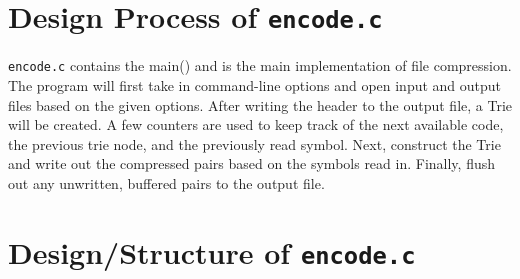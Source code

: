 \documentclass[12pt]{article}
\begin{document}
\section{Design Process of \texttt{encode.c}}

\texttt{encode.c} contains the main() and is the main implementation of file compression. The program will first take in command-line options and open input and output files based on the given options. After writing the header to the output file, a Trie will be created. A few counters are used to keep track of the next available code, the previous trie node, and the previously read symbol. Next, construct the Trie and write out the compressed pairs based on the symbols read in. Finally, flush out any unwritten, buffered pairs to the output file.
\\
\section{Design/Structure of \texttt{encode.c}}
\end{document}
